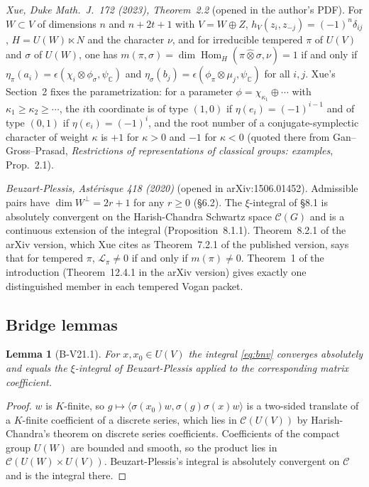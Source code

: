 \documentclass[11pt]{article}
\newtheorem{lemma}{Lemma}
\theoremstyle{definition}
\begin{document}
\emph{Xue, Duke Math.\ J.\ 172 (2023), Theorem~2.2} (opened in the author's PDF). For $W\subset V$ of dimensions $n$ and $n+2t+1$ with $V=W\oplus Z$, $h_V(z_i,z_{-j})=(-1)^n\delta_{ij}$, $H=U(W)\ltimes N$ and the character $\nu$, and for irreducible tempered $\pi$ of $U(V)$ and $\sigma$ of $U(W)$, one has $m(\pi,\sigma)=\dim\operatorname{Hom}_H(\pi\hat\otimes\sigma,\nu)=1$ if and only if $\eta_\pi(a_i)=\epsilon(\chi_i\otimes\phi_\sigma,\psi_{\mathbb C})$ and $\eta_\sigma(b_j)=\epsilon(\phi_\pi\otimes\mu_j,\psi_{\mathbb C})$ for all $i,j$. Xue's Section~2 fixes the parametrization: for a parameter $\phi=\chi_{\kappa_1}\oplus\cdots$ with $\kappa_1\ge\kappa_2\ge\cdots$, the $i$th coordinate is of type $(1,0)$ if $\eta(e_i)=(-1)^{i-1}$ and of type $(0,1)$ if $\eta(e_i)=(-1)^i$, and the root number of a conjugate-symplectic character of weight $\kappa$ is $+1$ for $\kappa>0$ and $-1$ for $\kappa<0$ (quoted there from Gan--Gross--Prasad, \emph{Restrictions of representations of classical groups: examples}, Prop.~2.1).

\emph{Beuzart-Plessis, Astérisque 418 (2020)} (opened in arXiv:1506.01452). Admissible pairs have $\dim W^\perp=2r+1$ for any $r\ge0$ (§6.2). The $\xi$-integral of §8.1 is absolutely convergent on the Harish-Chandra Schwartz space $\mathcal C(G)$ and is a continuous extension of the integral (Proposition~8.1.1). Theorem~8.2.1 of the arXiv version, which Xue cites as Theorem~7.2.1 of the published version, says that for tempered $\pi$, $\mathcal L_\pi\ne0$ if and only if $m(\pi)\ne0$. Theorem~1 of the introduction (Theorem~12.4.1 in the arXiv version) gives exactly one distinguished member in each tempered Vogan packet.

\subsection{Bridge lemmas}

\begin{lemma}[B-V21.1]
For $x,x_0\in U(V)$ the integral \eqref{eq:bnv} converges absolutely and equals the $\xi$-integral of Beuzart-Plessis applied to the corresponding matrix coefficient.
\end{lemma}
\begin{proof}
$w$ is $K$-finite, so $g\mapsto\langle\sigma(x_0)w,\sigma(g)\sigma(x)w\rangle$ is a two-sided translate of a $K$-finite coefficient of a discrete series, which lies in $\mathcal C(U(V))$ by Harish-Chandra's theorem on discrete series coefficients. Coefficients of the compact group $U(W)$ are bounded and smooth, so the product lies in $\mathcal C(U(W)\times U(V))$. Beuzart-Plessis's integral is absolutely convergent on $\mathcal C$ and is the integral there.
\end{proof}
\end{document}
